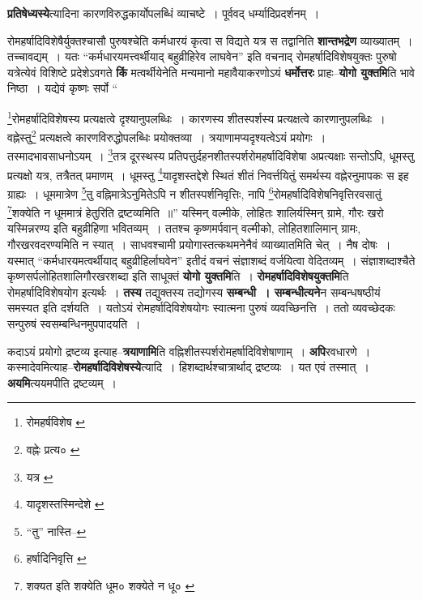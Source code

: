 \documentclass[article,12pt,a4paper]{memoir}
\begin{document}
	  \pstart \textbf{प्रतिषेध्यस्ये}त्यादिना कारणविरुद्धकार्योपलब्धिं व्याचष्टे । पूर्ववद् धर्म्यादिप्रदर्शनम् ।
	\pend
      

	  \pstart रोमहर्षादिविशेषैर्युक्तश्चासौ पुरुषश्चेति कर्मधारयं कृत्वा स विद्यते यत्र स तद्वानिति \textbf{शान्तभद्रेण} व्याख्यातम् । तच्चावद्यम् । यतः “कर्मधारयमत्त्वर्थीयाद् बहुव्रीहिरेव लाघवेन” इति वचनाद् रोमहर्षादिविशेषयुक्तः पुरुषो यत्रेत्येवं विशिष्टे प्रदेशेऽवगते \textbf{किं} मत्वर्थीयेनेति मन्यमानो महावैयाकरणोऽयं \textbf{धर्मोत्तरः} प्राहः--\textbf{योगो युक्तमि}ति भावे निष्ठा । यद्येवं कृष्णः सर्पो  \leavevmode{} “
	  
	\footnote{रोमहर्षविशेष \cite{dp-msD} \cite{dp-msB}}रोमहर्षादिविशेषस्य प्रत्यक्षत्वे दृश्यानुपलब्धिः । कारणस्य शीतस्पर्शस्य प्रत्यक्षत्वे कारणानुपलब्धिः । वह्नेस्तु\footnote{वह्नेः प्रत्य० \cite{dp-msC} \cite{dp-msD}} प्रत्यक्षत्वे कारणविरुद्धोपलब्धिः प्रयोक्तव्या । त्रयाणामप्यदृश्यत्वेऽयं प्रयोगः । तस्मादभावसाधनोऽयम् । \footnote{यत्र \cite{dp-msA}}तत्र दूरस्थस्य प्रतिपत्तुर्दहनशीतस्पर्शरोमहर्षादिविशेषा अप्रत्यक्षाः सन्तोऽपि, धूमस्तु प्रत्यक्षो यत्र, तत्रैतत् प्रमाणम् । धूमस्तु \footnote{यादृशस्तस्मिन्देशे \cite{dp-msA} \cite{dp-msC} \cite{dp-edP} \cite{dp-edH} \cite{dp-edE} \cite{dp-edN}}यादृशस्तद्देशे स्थितं शीतं निवर्त्तयितुं समर्थस्य वह्नेरनुमापकः स इह ग्राह्यः । धूममात्रेण \footnote{“तु” नास्ति--\cite{dp-msA}}तु वह्निमात्रेऽनुमितेऽपि न शीतस्पर्शनिवृत्तिः, नापि \footnote{हर्षादिनिवृत्ति \cite{dp-msD} \cite{dp-msB}}रोमहर्षादिविशेषनिवृत्तिरवसातुं \footnote{शक्यत इति \cite{dp-msC} शक्येति धूम० \cite{dp-msA} शक्येते न धू० \cite{dp-edH}}शक्येति न धूममात्रं हेतुरिति द्रष्टव्यमिति ॥” यस्मिन् वल्मीके, लोहितः शालिर्यस्मिन् ग्रामे, गौरः खरो यस्मिन्नरण्य इति बहुव्रीहिणा भवितव्यम् । ततश्च कृष्णमर्पवान् वल्मीको, लोहितशालिमान् ग्रामः, गौरखरवदरण्यमिति न स्यात् । साधवश्चामी प्रयोगास्तत्कथमनेनैवं व्याख्यातमिति चेत् । नैष दोषः । यस्मात् “कर्मधारयमत्वर्थीयाद् बहुव्रीहिर्लाघवेन” इतीदं वचनं संज्ञाशब्दं वर्जयित्वा वेदितव्यम् । संज्ञाशब्दाश्चैते कृष्णसर्पलोहितशालिगौरखरशब्दा इति साधूक्तं \textbf{योगो युक्तमि}ति । \textbf{रोमहर्षादिविशेषयुक्तमि}ति रोमहर्षादिविशेषयोग इत्यर्थः । \textbf{तस्य} तद्युक्तस्य तद्योगस्य \textbf{सम्बन्धी । सम्बन्धीत्यने}न सम्बन्धषष्ठीयं समस्यत इति दर्शयति । यतोऽयं रोमहर्षादिविशेषयोगः स्वात्मना पुरुषं व्यवच्छिनत्ति । ततो व्यवच्छेदकः सन्पुरुषं स्वसम्बन्धिनमुपपादयति ।
	\pend
      

	  \pstart कदाऽयं प्रयोगो द्रष्टव्य इत्याह--\textbf{त्रयाणामि}ति वह्निशीतस्पर्शरोमहर्षादिविशेषाणाम् । \textbf{अपि}रवधारणे । कस्मादेवमित्याह--\textbf{रोमहर्षादिविशेषस्ये}त्यादि । हिशब्दार्थश्चात्रार्थाद् द्रष्टव्यः । यत एवं तस्मात् । \leavevmode{} \textbf{अयमि}त्ययमपीति द्रष्टव्यम् ।
	\pend
      
\end{document}
